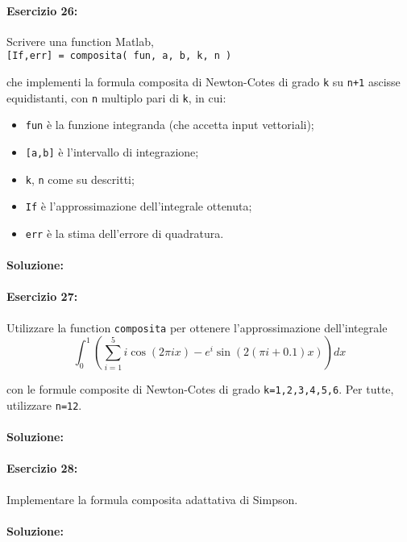 \documentclass[12pt]{article}
\begin{document}
\paragraph{Esercizio 26:}
Scrivere una function Matlab, \\

\texttt{[If,err] = composita( fun, a, b, k, n )}

che implementi la formula composita di Newton-Cotes di grado \texttt{k} su \texttt{n+1} ascisse equidistanti, con \texttt{n}
multiplo pari di \texttt{k}, in cui:

\begin{itemize}
    \item \texttt{fun} è la funzione integranda (che accetta input vettoriali);
    \item \texttt{[a,b]} è l’intervallo di integrazione;
    \item \texttt{k}, \texttt{n} come su descritti;
    \item \texttt{If} è l’approssimazione dell’integrale ottenuta;
    \item \texttt{err} è la stima dell’errore di quadratura.
\end{itemize}
\paragraph{Soluzione:}


\paragraph{Esercizio 27:}
Utilizzare la function \texttt{composita} per ottenere l’approssimazione dell’integrale\\

$$\int_{0}^{1}(\sum_{i=1}^{5}i\cos(2\pi{ix})-e^{i}\sin(2(\pi{i}+0.1)x))dx$$

con le formule composite di Newton-Cotes di grado \texttt{k=1,2,3,4,5,6}. Per tutte, utilizzare \texttt{n=12}.

\paragraph{Soluzione:}


\paragraph{Esercizio 28:}
Implementare la formula composita adattativa di Simpson.

\paragraph{Soluzione:}
\end{document}
